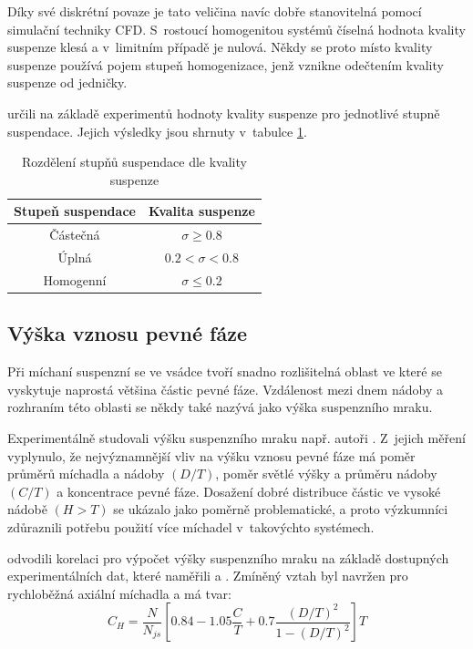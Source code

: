 \noindent Díky své diskrétní povaze je tato veličina navíc dobře stanovitelná pomocí simulační techniky CFD. S~rostoucí homogenitou systémů číselná hodnota kvality suspenze klesá a v~limitním případě je nulová. Někdy se proto místo kvality suspenze používá pojem stupeň homogenizace, jenž vznikne odečtením kvality suspenze od jedničky.

\citet{boh80} určili na základě experimentů hodnoty kvality suspenze pro jednotlivé stupně suspendace. Jejich výsledky jsou shrnuty v~tabulce \ref{tab:kvasus}.

\begin{table}[h!]
\centering
\caption{Rozdělení stupňů suspendace dle kvality suspenze}
\label{tab:kvasus}
\begin{tabular}{cc}
\toprule
Stupeň suspendace & Kvalita suspenze \\
\midrule

Částečná &  $\sigma \geq \num{0.8}$ \\
Úplná & $\num{0.2} < \sigma < \num{0.8}$ \\
Homogenní & $\sigma \leq \num{0.2}$ \\

\bottomrule
\end{tabular}
\end{table}

\subsection{Výška vznosu pevné fáze}
Při míchaní suspenzní se ve vsádce tvoří snadno rozlišitelná oblast ve které se vyskytuje naprostá většina částic pevné fáze. Vzdálenost mezi dnem nádoby a rozhraním této oblasti se někdy také nazývá jako výška suspenzního mraku. 

Experimentálně studovali výšku suspenzního mraku např. autoři \citet{hic97}. Z~jejich měření vyplynulo, že nejvýznamnější vliv na výšku vznosu pevné fáze má poměr průměrů míchadla a nádoby $(D/T)$, poměr světlé výšky a průměru nádoby $(C/T)$ a koncentrace pevné fáze. Dosažení dobré distribuce částic ve vysoké nádobě $(H > T)$ se ukázalo jako poměrně problematické, a proto výzkumníci zdůraznili potřebu použití více míchadel v~takovýchto systémech.

\citet{bit02} odvodili korelaci pro výpočet výšky suspenzního mraku na základě dostupných experimentálních dat, které naměřili \citet{hic97} a \citet{buj99}. Zmíněný vztah byl navržen pro rychloběžná axiální míchadla a má tvar:
\begin{equation}
	C_{H}=\frac{N}{N_{js}}\left[\num{0.84} - \num{1.05}\frac{C}{T} + \num{0.7}\frac{(D/T)^{2}}{1 - (D/T)^{2}}  \right]T
	\label{eq:sushei}
\end{equation}  

